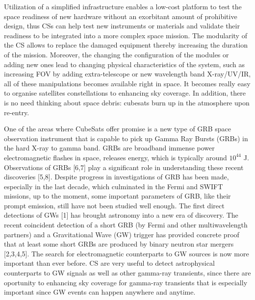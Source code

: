 

Utilization of a simplified infrastructure enables a low-cost platform to test the space readiness of new hardware without an exorbitant amount of prohibitive design, thus
CSs can help test new instruments or materials and validate their readiness to be integrated into a more complex space mission.
The modularity of the CS allows to replace the damaged equipment thereby increasing the duration of the mission.
Moreover, the changing the configuration of the modules or adding new ones lead to changing physical characteristics of the system,
such as increasing FOV by adding extra-telescope or new wavelength band X-ray/UV/IR, all of these manipulations becomes available right in space.
It becomes really easy to organise satellites constellations to enhancing sky coverage.
In addition, there is no need thinking about space debris: cubesats burn up in the atmosphere upon re-entry.

One of the areas where CubeSats offer promise is a new type of GRB space observation instrument that is capable to pick up Gamma Ray Bursts (GRBs) in the hard X-ray to gamma band.
GRBs are broadband immense power electromagnetic flashes in space, releases energy, which is typically around $10^{44}$ J.
Observations of GRBs [6,7] play a significant role in understanding these recent discoveries [5,8].
Despite progress in investigations of GRB has been made, especially in the last decade, which culminated in the Fermi and SWIFT missions, up to the moment, some important parameters of GRB, like their prompt emission, still have not been studied well enough. 
The first direct detections of GWs [1] has brought astronomy into a new era of discovery.
The recent coincident detection of a short GRB (by Fermi and other multiwavelength partners) and a Gravitational Wave (GW) trigger has provided concrete proof that at least some short GRBs are produced by binary neutron star mergers [2,3,4,5]. The search for electromagnetic counterparts to GW sources is now more important than ever before.
CS are very useful to detect astrophysical counterparts to GW signals as well as other gamma-ray transients,
since there are oportunity to enhancing sky coverage for gamma-ray transients that is especially important since GW events can happen anywhere and anytime.

